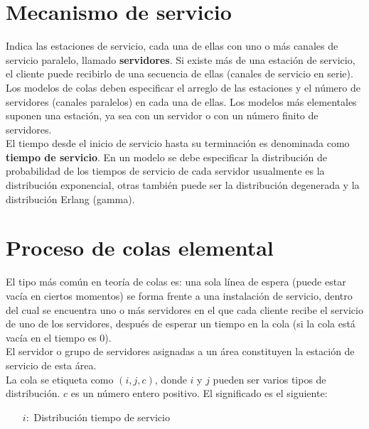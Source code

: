 \documentclass{book}
\begin{document}
\section{Mecanismo de servicio}
Indica las estaciones de servicio, cada una de ellas con uno o más canales de servicio paralelo, llamado \textbf{servidores}. Si existe más de una estación de servicio, el cliente puede recibirlo de una secuencia de ellas (canales de servicio en serie). Los modelos de colas deben especificar el arreglo de las estaciones y el número de servidores (canales paralelos) en cada una de ellas. Los modelos más elementales suponen una estación, ya sea con un servidor o con un número finito de servidores.\\

El tiempo desde el inicio de servicio hasta su terminación es denominada como \textbf{tiempo de servicio}. En un modelo se debe especificar la distribución de probabilidad de los tiempos de servicio de cada servidor usualmente es la distribución exponencial, otras también puede ser la distribución degenerada y la distribución Erlang (gamma).

\section{Proceso de colas elemental}
El tipo más común en teoría de colas es: una sola línea de espera (puede estar vacía en ciertos momentos) se forma frente a una instalación de servicio, dentro del cual se encuentra uno o más servidores en el que cada cliente recibe el servicio de uno de los servidores, después de esperar un tiempo en la cola (si la cola está vacía en el tiempo es 0).\\

El servidor o grupo de servidores asignadas a un área constituyen la estación de servicio de esta área.\\

La cola se etiqueta como $(i,j,c)$, donde $i$ y $j$ pueden ser varios tipos de distribución. $c$ es un número entero positivo. El significado es el siguiente:

\begin{itemize}
	\item[$i:$] Distribución tiempo de servicio   
\end{itemize}




\newpage


\end{document}
